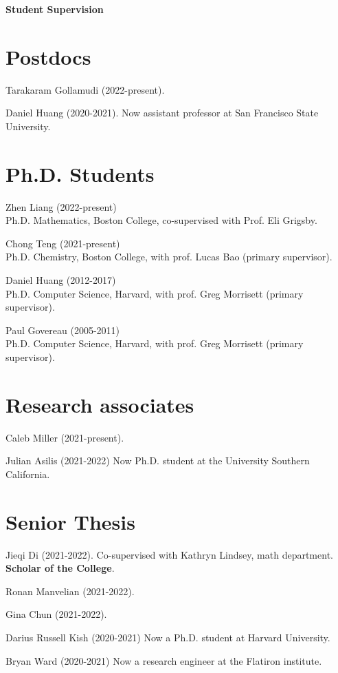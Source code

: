 \documentclass[margin,line]{res}
\begin{document}
\begin{resume}
\newpage
  {\bf {\Large Student Supervision}}

\section{\sc Postdocs}

Tarakaram Gollamudi (2022-present).

Daniel Huang (2020-2021). \hfill Now assistant professor at San Francisco State University.

\section{\sc Ph.D. Students}

Zhen Liang (2022-present)\\
Ph.D. Mathematics, Boston College, co-supervised with Prof. Eli Grigsby.

Chong Teng (2021-present)\\
Ph.D. Chemistry, Boston College, with prof. Lucas Bao (primary supervisor).

Daniel Huang (2012-2017)\\
Ph.D. Computer Science, Harvard, with prof. Greg Morrisett (primary supervisor). 

Paul Govereau (2005-2011)\\
Ph.D. Computer Science, Harvard, with prof. Greg Morrisett (primary supervisor). 

\section{\sc Research associates}

Caleb Miller (2021-present).

Julian Asilis (2021-2022) \hfill Now Ph.D. student at the University Southern California.

\section{\sc Senior Thesis}

Jieqi Di (2021-2022). Co-supervised with Kathryn Lindsey, math department. {\bf Scholar of the College}.

Ronan Manvelian (2021-2022).

Gina Chun (2021-2022).

Darius Russell Kish (2020-2021) \hfill Now a Ph.D. student at Harvard University.

Bryan Ward (2020-2021) \hfill Now a research engineer at the Flatiron institute.


\end{resume}
\end{document}
